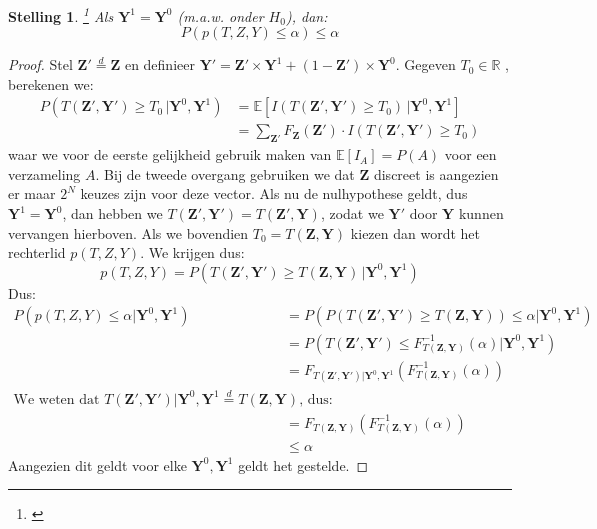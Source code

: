 \documentclass[12pt, a4paper, faculty=we]{ugent-doc}
\newcommand{\E}[1]{\mathds{E}[#1]}
\newcommand{\bfZ}{\textbf{Z}}
\newtheorem{stelling}{Stelling}
\begin{document}
\begin{stelling} \footnote{\cite{gherardi2023}}
    \label{theorem: Fisher}
    Als $\mathbf{Y}^1 = \mathbf{Y}^0$ (m.a.w. onder $H_0$), dan:
    \[P(p(T,Z,Y)\leq \alpha) \leq \alpha \]
\end{stelling}
\begin{proof}
    Stel $\mathbf{Z}' \overset{d}{=} \bfZ$ en definieer $\mathbf{Y}' = \mathbf{Z}' \times \mathbf{Y}^1 + (1-\mathbf{Z}') \times \mathbf{Y}^0$. Gegeven $T_0 \in \mathds{R}$
    , berekenen we:
    \begin{align*}
        P(T(\mathbf{Z}', \mathbf{Y}') \geq T_0 \, | \mathbf{Y}^0, \mathbf{Y}^1) &= \E{I(T(\mathbf{Z}', \mathbf{Y}') \geq T_0) \, | \mathbf{Y}^0, \mathbf{Y}^1} \\
        &= \sum_{\mathbf{Z}'} F_{\mathbf{Z}}(\mathbf{Z}')\cdot I(T(\mathbf{Z}' , \mathbf{Y}') \geq T_0)
    \end{align*}
    waar we voor de eerste gelijkheid gebruik maken van $\E{I_A} = P(A)$ voor een verzameling $A$. Bij de tweede overgang gebruiken we dat $\mathbf{Z}$ discreet is aangezien
    er maar $2^N$ keuzes zijn voor deze vector. Als nu de nulhypothese geldt, dus  $\mathbf{Y}^1 = \mathbf{Y}^0$, dan hebben we $T(\mathbf{Z}', \mathbf{Y}') = 
    T(\mathbf{Z}', \mathbf{Y})$, zodat we $\mathbf{Y}'$ door $\mathbf{Y}$ kunnen vervangen hierboven. Als we bovendien $T_0 = T(\bfZ, \mathbf{Y})$ kiezen dan wordt het
    rechterlid $p(T,Z,Y)$. We krijgen dus:
    $$p(T,Z,Y)=P(T(\mathbf{Z}', \mathbf{Y}') \geq T(\bfZ, \mathbf{Y}) \, | \mathbf{Y}^0, \mathbf{Y}^1)$$
    Dus:
    \begin{align*}
        P(p(T,Z,Y)\leq \alpha | \mathbf{Y}^0, \mathbf{Y}^1)  &= P(P(T(\mathbf{Z}', \mathbf{Y}') \geq T(\bfZ, \mathbf{Y}) )\leq \alpha | \mathbf{Y}^0, \mathbf{Y}^1)\\
                                &= P(T(\mathbf{Z}', \mathbf{Y}') \leq F^{-1}_{T(\bfZ, \mathbf{Y})} (\alpha) | \mathbf{Y}^0, \mathbf{Y}^1)\\
                                &= F_{T(\mathbf{Z}', \mathbf{Y}') | \mathbf{Y}^0, \mathbf{Y}^1}(F^{-1}_{T(\bfZ, \mathbf{Y})} (\alpha))\\
    \text{We weten dat $T(\mathbf{Z}', \mathbf{Y}') | \mathbf{Y}^0, \mathbf{Y}^1 \overset{d}{=} T(\bfZ, \mathbf{Y})$, dus:}\\
                                &= F_{T(\bfZ, \mathbf{Y})}(F^{-1}_{T(\bfZ, \mathbf{Y})} (\alpha))\\
                                &\leq \alpha
    \end{align*}
    Aangezien dit geldt voor elke $\mathbf{Y}^0, \mathbf{Y}^1$ geldt het gestelde.
\end{proof}
\end{document}
